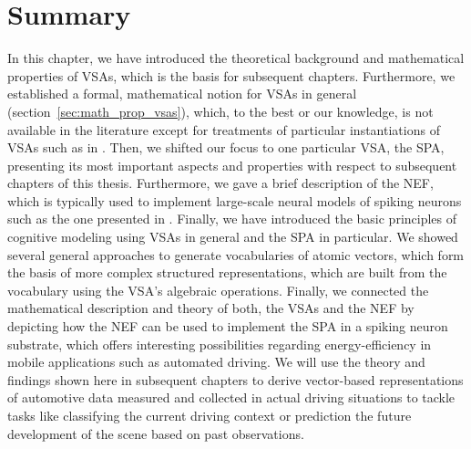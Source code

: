 \section{Summary}
In this chapter, we have introduced the theoretical background and mathematical properties of \aclp{VSA}, which is the basis for subsequent chapters.
Furthermore, we established a formal, mathematical notion for \acp{VSA} in general (section~\ref{sec:math_prop_vsas}), which, to the best or our knowledge, is not available in the literature except for treatments of particular instantiations of \acp{VSA} such as in \textcites{Plate1994}{Gayler1998}{Kanerva2009}.
Then, we shifted our focus to one particular \ac{VSA}, the \ac{SPA}, presenting its most important aspects and properties with respect to subsequent chapters of this thesis.
Furthermore, we gave a brief description of the \acl{NEF}, which is typically used to implement large-scale neural models of spiking neurons such as the one presented in \textcite{Eliasmith2012}.
Finally, we have introduced the basic principles of cognitive modeling using \acp{VSA} in general and the \ac{SPA} in particular.
We showed several general approaches to generate vocabularies of atomic vectors, which form the basis of more complex structured representations, which are built from the vocabulary using the \ac{VSA}'s algebraic operations.
Finally, we connected the mathematical description and theory of both, the \acp{VSA} and the \ac{NEF} by depicting how the \ac{NEF} can be used to implement the \ac{SPA} in a spiking neuron substrate, which offers interesting possibilities regarding energy-efficiency in mobile applications such as automated driving.
We will use the theory and findings shown here in subsequent chapters to derive vector-based representations of automotive data measured and collected in actual driving situations to tackle tasks like classifying the current driving context or prediction the future development of the scene based on past observations.
